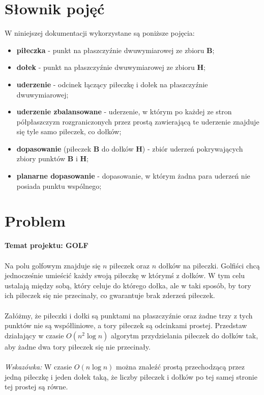 \documentclass[10pt,a4paper]{article}
\begin{document}
	\newpage
	
	\section{Słownik pojęć}
	
	W niniejszej dokumentacji wykorzystane są poniższe pojęcia:
	\begin{itemize}
		\item \textbf{piłeczka} - punkt na płaszczyźnie dwuwymiarowej ze zbioru $\mathbf{B}$;
		\item \textbf{dołek} - punkt na płaszczyźnie dwuwymiarowej ze zbioru $\mathbf{H}$;
		\item \textbf{uderzenie} - odcinek łączący piłeczkę i dołek na płaszczyźnie dwuwymiarowej;
		\item \textbf{uderzenie zbalansowane} - uderzenie, w którym po każdej ze stron półpłaszczyzn rozgraniczonych przez prostą zawierającą te uderzenie znajduje się tyle samo piłeczek, co dołków;
		\item \textbf{dopasowanie} (piłeczek $\mathbf{B}$ do dołków $\mathbf{H}$) - zbiór uderzeń pokrywających zbiory punktów $\mathbf{B}$ i $\mathbf{H}$;
		\item \textbf{planarne dopasowanie} - dopasowanie, w którym żadna para uderzeń nie posiada punktu wspólnego;
	\end{itemize}
	
	\section{Problem}
	
	\textbf{Temat projektu: GOLF} \\~\\
	Na polu golfowym znajduje się $n$ piłeczek oraz $n$ dołków na piłeczki. Golfiści chcą jednocześnie umieścić każdy swoją piłeczkę w którymś z dołków. W tym celu ustalają między sobą, który celuje do którego dołka, ale w taki sposób, by tory ich	piłeczek się nie przecinały, co gwarantuje brak zderzeń piłeczek.\\~\\ 
	Załóżmy, że piłeczki i dołki są punktami na płaszczyźnie oraz żadne trzy z tych punktów nie są współliniowe, a tory piłeczek są odcinkami prostej. Przedstaw działający w czasie $O(n^2\log n)$ algorytm przydzielania piłeczek do dołków tak, aby żadne dwa tory piłeczek się nie przecinały.\\~\\
	\textit{Wskazówka:} W czasie $O(n\log n)$ można znaleźć prostą przechodzącą przez jedną piłeczkę i jeden dołek taką, że liczby piłeczek i dołków po tej samej stronie tej prostej są równe.
	
\end{document}
